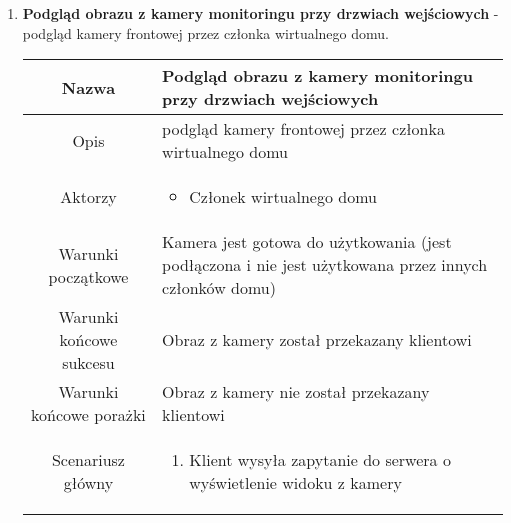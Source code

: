 \documentclass{article}
\begin{document}
\begin{enumerate}
\begin{enumerate}
			\item \textbf{Podgląd obrazu z kamery monitoringu przy drzwiach
				wejściowych} - podgląd kamery frontowej przez członka wirtualnego domu.
				\begin{table}[H]
					\centering
					\begin{tabular}{|c|p{7cm}|}
						\hline
						Nazwa                   & \textbf{Podgląd obrazu z kamery monitoringu przy drzwiach wejściowych}                                                                                                                                                                              \\
						\hline
						Opis                    & podgląd kamery frontowej przez członka wirtualnego domu                                                                                                                                                                                             \\
						\hline
						Aktorzy                 & \begin{itemize}\item Członek wirtualnego domu\end{itemize}                                                                                                                                                                                          \\
						\hline
						Warunki początkowe      & Kamera jest gotowa do użytkowania (jest podłączona i nie jest użytkowana przez innych członków domu)                                                                                                                                                \\
						\hline
						Warunki końcowe sukcesu & Obraz z kamery został przekazany klientowi                                                                                                                                                                                                          \\
						\hline
						Warunki końcowe porażki & Obraz z kamery nie został przekazany klientowi                                                                                                                                                                                                      \\
						\hline
						Scenariusz główny       & \begin{enumerate}\item Klient wysyła zapytanie do serwera o wyświetlenie widoku z kamery


\end{enumerate}
\end{tabular}
\end{table}
\end{enumerate}
\end{enumerate}
\end{document}
